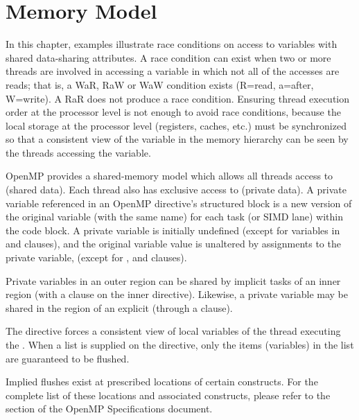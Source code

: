 \pagebreak
\chapter{Memory Model}
\label{chap:memory_model}

In this chapter, examples illustrate race conditions on access to variables with
shared data-sharing attributes.  A race condition can exist when two
or more threads are involved in accessing a variable in which not all
of the accesses are reads; that is, a WaR, RaW or WaW condition
exists (R=read, a=after, W=write). A RaR does not produce a race condition.
 Ensuring thread execution order at
the processor level is not enough to avoid race conditions, because the
local storage at the processor level (registers, caches, etc.)
must be synchronized so that a consistent view of the variable in the
memory hierarchy can be seen by the threads accessing the variable.

OpenMP provides a shared-memory model which allows all threads access
to  (shared data).  Each thread also has exclusive
access to  (private data).  A private
variable referenced in an OpenMP directive's structured block is a
new version of the original variable (with the same name) for each
task (or SIMD lane) within the code block.  A private variable is
initially undefined (except for variables in 
and  clauses), and the original variable value is
unaltered by assignments to the private variable, (except for
,  and  clauses).

Private variables in an outer  region can be
shared by implicit tasks of an inner  region 
(with a  clause on the inner  directive).
Likewise, a private variable may be shared in the region of an
explicit  (through a  clause).


The  directive forces a  consistent view of local variables
of the thread executing the .
When a list is supplied on the directive, only the items (variables)
in the list are guaranteed to be flushed.

Implied flushes exist at prescribed locations of certain constructs. 
For the complete list of these locations and associated constructs,
please refer to the  section of the OpenMP 
Specifications document.

